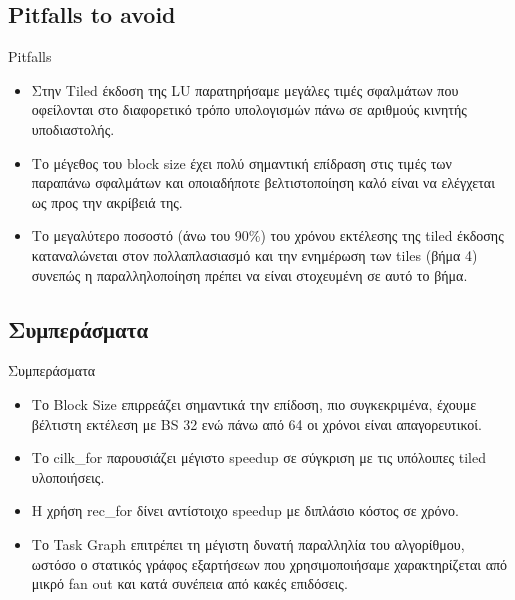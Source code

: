 \documentclass{beamer}
\begin{document}
\subsection{Pitfalls to avoid}
\begin{frame}{Pitfalls}
    \begin{itemize}
            \item<1-> Στην Tiled έκδοση της LU παρατηρήσαμε μεγάλες τιμές
                σφαλμάτων που οφείλονται στο διαφορετικό τρόπο υπολογισμών
                πάνω σε αριθμούς κινητής υποδιαστολής.
            \item<2-> Το μέγεθος του block size έχει πολύ σημαντική επίδραση
                στις τιμές των παραπάνω σφαλμάτων και οποιαδήποτε
                βελτιστοποίηση καλό είναι να ελέγχεται ως προς την ακρίβειά
                της.
            \item<3-> Το μεγαλύτερο ποσοστό (άνω του 90\%) του χρόνου
                εκτέλεσης της tiled έκδοσης καταναλώνεται στον πολλαπλασιασμό
                και την ενημέρωση των tiles (βήμα 4) συνεπώς η παραλληλοποίηση
                πρέπει να είναι στοχευμένη σε αυτό το βήμα.
    \end{itemize}
\end{frame}


\subsection{Συμπεράσματα}
\begin{frame}{Συμπεράσματα}
    \begin{itemize}
            \item<1-> Το Block Size επιρρεάζει σημαντικά την επίδοση, πιο
                συγκεκριμένα, έχουμε βέλτιστη εκτέλεση με BS 32 ενώ πάνω από
                64 οι χρόνοι είναι απαγορευτικοί.
            \item<2-> Το cilk\_for παρουσιάζει μέγιστο speedup σε σύγκριση με
                τις υπόλοιπες tiled υλοποιήσεις.
            \item<3-> Η χρήση rec\_for δίνει αντίστοιχο speedup με διπλάσιο
                κόστος σε χρόνο.
            \item<4-> Το Task Graph επιτρέπει τη μέγιστη δυνατή παραλληλία του
                αλγορίθμου, ωστόσο ο στατικός γράφος εξαρτήσεων που
                χρησιμοποιήσαμε χαρακτηρίζεται από μικρό fan out και κατά
                συνέπεια από κακές επιδόσεις.
    \end{itemize}
\end{frame}
\end{document}
